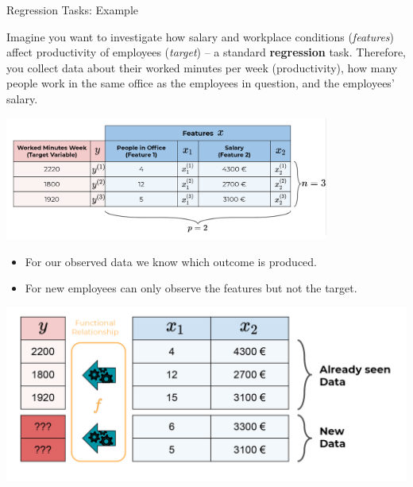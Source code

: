 \documentclass[11pt,compress,t,notes=noshow, xcolor=table]{beamer}
\begin{document}
\begin{vbframe}{Regression Tasks: Example}

Imagine you want to investigate how salary and workplace conditions 
(\emph{features}) affect productivity of employees (\emph{target}) -- a standard 
\textbf{regression} task. Therefore, you collect data about their worked minutes 
per week (productivity), how many people work in the same office as the 
employees in question, and the employees' salary.
  
\begin{center}
  \includegraphics[width = 0.8\textwidth]{figure_man/data_table} 
\end{center}

\framebreak

\begin{itemize}

  \item For our observed data we know which outcome is produced.
  
  \item For new employees can only observe the features but not the target.

\end{itemize}

\begin{center}
  \includegraphics[width=\textwidth]{figure_man/what_is_a_model_web} 
\end{center}

\end{vbframe}
\end{document}
